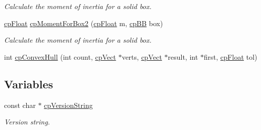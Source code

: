 \begin{DoxyCompactItemize}
\begin{DoxyCompactList}\small\item\em Calculate the moment of inertia for a solid box. \end{DoxyCompactList}\item 
\hypertarget{group__misc_ga435b78dde186a991f207df58d88e88d2}{\hyperlink{group__basic_types_gac1ed65573e035bf892505768c852d8d3}{cp\-Float} \hyperlink{group__misc_ga435b78dde186a991f207df58d88e88d2}{cp\-Moment\-For\-Box2} (\hyperlink{group__basic_types_gac1ed65573e035bf892505768c852d8d3}{cp\-Float} m, \hyperlink{structcp_b_b}{cp\-B\-B} box)}\label{group__misc_ga435b78dde186a991f207df58d88e88d2}

\begin{DoxyCompactList}\small\item\em Calculate the moment of inertia for a solid box. \end{DoxyCompactList}\item 
int \hyperlink{group__misc_ga219e9fabc810f8f9134712519b002cd8}{cp\-Convex\-Hull} (int count, \hyperlink{structcp_vect}{cp\-Vect} $\ast$verts, \hyperlink{structcp_vect}{cp\-Vect} $\ast$result, int $\ast$first, \hyperlink{group__basic_types_gac1ed65573e035bf892505768c852d8d3}{cp\-Float} tol)
\end{DoxyCompactItemize}
\subsection*{Variables}
\begin{DoxyCompactItemize}
\item 
\hypertarget{group__misc_gacecd153caab362b7e2e33b4f37a0fe55}{const char $\ast$ \hyperlink{group__misc_gacecd153caab362b7e2e33b4f37a0fe55}{cp\-Version\-String}}\label{group__misc_gacecd153caab362b7e2e33b4f37a0fe55}

\begin{DoxyCompactList}\small\item\em Version string. \end{DoxyCompactList}\end{DoxyCompactItemize}


